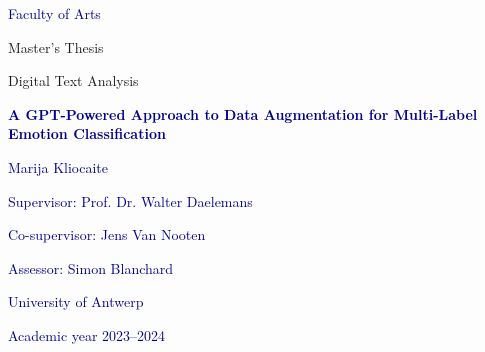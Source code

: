 \thispagestyle{plain}
    \begin{center}
    
        \vspace*{1cm}

        \large
        \textcolor{darkblue}{Faculty of Arts}
        
        \vspace{0.5cm}
        Master’s Thesis 
        
        \vspace{0.5cm}
        Digital Text Analysis 
        
       \vspace{1.5cm}
            
        \Huge
        \textcolor{darkblue}{\textbf{A GPT-Powered Approach 
to Data Augmentation for 
Multi-Label Emotion 
Classification}}
            
        \vspace{0.5cm}
        \LARGE
        \textcolor{darkblue}{}
            
        \vspace{1.5cm}
        
        \Large    
        \textcolor{darkblue}{Marija Kliocaite}
        
        \vspace{0.5cm}
        
        \large
        \textcolor{darkblue}{Supervisor: Prof. Dr. Walter Daelemans}
        
        \vspace{0.5cm}
        \textcolor{darkblue}{Co-supervisor: Jens Van Nooten}
        
        \vspace{0.5cm}
        \textcolor{darkblue}{Assessor: Simon Blanchard}
        
        \vspace{1cm}
        \textcolor{darkblue}{University of Antwerp}
        
        \vspace{1cm}   
        \textcolor{darkblue}{Academic year 2023–2024}
            
    \end{center}